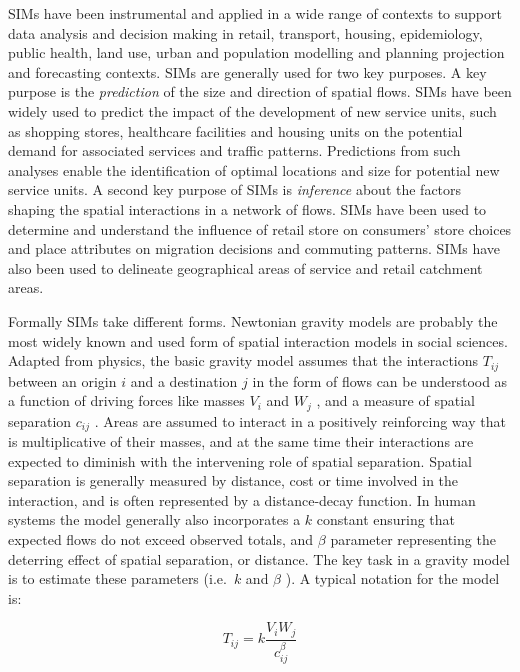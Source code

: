 \documentclass[11pt,letterpaper]{article}
\begin{document}
SIMs have been instrumental and applied in a wide range of contexts to support data analysis and decision making in retail, transport, housing, epidemiology, public health, land use, urban and population modelling and planning projection and forecasting contexts.
SIMs are generally used for two key purposes.
A key purpose is the \emph{prediction} of the size and direction of spatial flows.
SIMs have been widely used to predict the impact of the development of new service units, such as shopping stores, healthcare facilities and housing units on the potential demand for associated services and traffic patterns.
Predictions from such analyses enable the identification of optimal locations and size for potential new service units.
A second key purpose of SIMs is \emph{inference} about the factors shaping the spatial interactions in a network of flows.
SIMs have been used to determine and understand the influence of retail store on consumers' store choices and place attributes on migration decisions and commuting patterns.
SIMs have also been used to delineate geographical areas of service and retail catchment areas.

Formally SIMs take different forms.
Newtonian gravity models are probably the most widely known and used form of spatial interaction models in social sciences.
Adapted from physics, the basic gravity model assumes that the interactions \(T_{i j}\) between an origin \(i\) and a destination \(j\) in the form of flows can be understood as a function of driving forces like masses \(V_{i}\) and \(W_{j}\) , and a measure of spatial separation \(c_{ij}\) .
Areas are assumed to interact in a positively reinforcing way that is multiplicative of their masses, and at the same time their interactions are expected to diminish with the intervening role of spatial separation.
Spatial separation is generally measured by distance, cost or time involved in the interaction, and is often represented by a distance-decay function.
In human systems the model generally also incorporates a \(k\) constant ensuring that expected flows do not exceed observed totals, and \(\beta\) parameter representing the deterring effect of spatial separation, or distance.
The key task in a gravity model is to estimate these parameters (i.e.~\(k\) and \(\beta\) ).
A typical notation for the model is:

\[
T_{i j}=k \frac{V_{i} W_{j}}{c_{i j}^{\beta}}
\]
\end{document}
